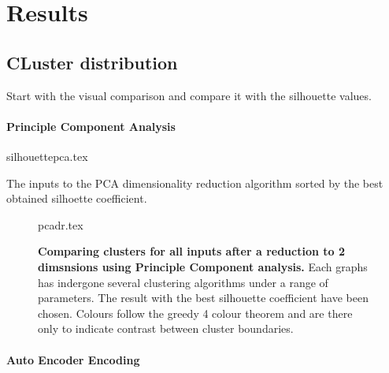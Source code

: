 \section{Results}\label{sec:drres}
% 

\subsection{CLuster distribution}

Start with the visual comparison and compare it with the silhouette values. 




\paragraph*{Principle Component Analysis}


\begin{table}[H]
    \centering
        {silhouettepca.tex}
        \caption{The inputs to the PCA dimensionality reduction algorithm sorted by the best obtained silhoette coefficient.  }
        \label{tab:pcasil}
\end{table}



\begin{landscape}
\begin{figure}[H]
    {pcadr.tex}
    \caption{\textbf{Comparing clusters for all inputs after a reduction to 2 dimsnsions using Principle Component analysis.}
    Each graphs has indergone several clustering algorithms under a range of parameters. The result with the best silhouette coefficient have been chosen. Colours follow the greedy 4 colour theorem and are there only to indicate contrast between cluster boundaries.}
    \label{fig:pcavis}
\end{figure}
\end{landscape}






\paragraph*{Auto Encoder Encoding}

